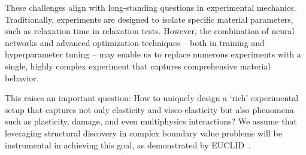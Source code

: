 These challenges align with long-standing questions in experimental mechanics. 
Traditionally, experiments are designed to isolate specific material parameters, such as relaxation time in relaxation tests. 
However, the combination of neural networks and advanced optimization techniques -- both in training and hyperparameter tuning -- may enable us to replace numerous experiments with a single, highly complex experiment that captures comprehensive material behavior.

This raises an important question: 
How to uniquely design a `rich' experimental setup that captures not only elasticity and visco-elasticity but also phenomena such as plasticity, damage, and even multiphysics interactions?
We assume that leveraging structural discovery in complex boundary value problems will be instrumental in achieving this goal, as demonstrated by EUCLID~\cite{flaschel2022}.
%
